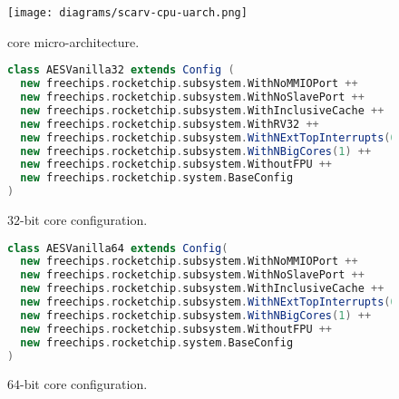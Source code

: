 
\begin{figure}[!h]
\centering
\texttt{[image: diagrams/scarv-cpu-uarch.png]}
\caption{
   core micro-architecture.
}
\label{fig:core:2:normal}
\end{figure}

\begin{figure}[!h]
\begin{lstlisting}[style={block},language={scala}]
class AESVanilla32 extends Config (
  new freechips.rocketchip.subsystem.WithNoMMIOPort ++
  new freechips.rocketchip.subsystem.WithNoSlavePort ++
  new freechips.rocketchip.subsystem.WithInclusiveCache ++
  new freechips.rocketchip.subsystem.WithRV32 ++
  new freechips.rocketchip.subsystem.WithNExtTopInterrupts(0) ++
  new freechips.rocketchip.subsystem.WithNBigCores(1) ++
  new freechips.rocketchip.subsystem.WithoutFPU ++
  new freechips.rocketchip.system.BaseConfig
)
\end{lstlisting}
\caption{$32$-bit  core configuration.}
\label{fig:rocket:32}
\end{figure}

\begin{figure}[!h]
\begin{lstlisting}[style={block},language={scala}]
class AESVanilla64 extends Config(
  new freechips.rocketchip.subsystem.WithNoMMIOPort ++
  new freechips.rocketchip.subsystem.WithNoSlavePort ++
  new freechips.rocketchip.subsystem.WithInclusiveCache ++
  new freechips.rocketchip.subsystem.WithNExtTopInterrupts(0) ++
  new freechips.rocketchip.subsystem.WithNBigCores(1) ++
  new freechips.rocketchip.subsystem.WithoutFPU ++
  new freechips.rocketchip.system.BaseConfig
)
\end{lstlisting}
\caption{$64$-bit  core configuration.}
\label{fig:rocket:64}
\end{figure}


